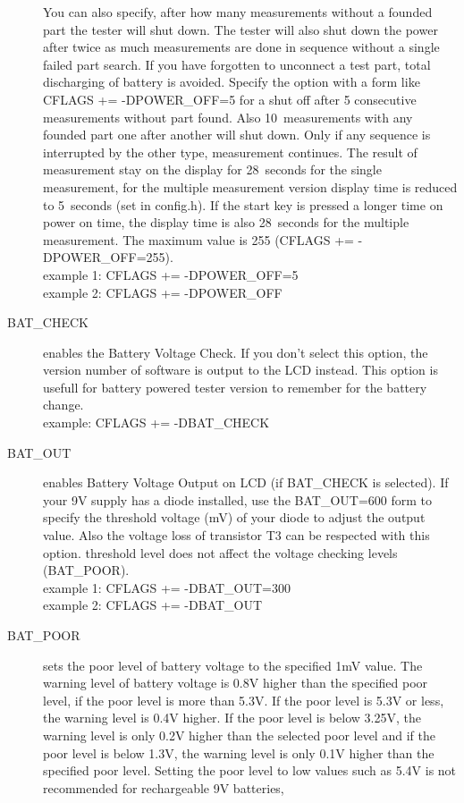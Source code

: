\begin{description}
You can also specify, after how many measurements without a founded part the tester will shut down.
The tester will also shut down the power after twice as much measurements are done in sequence without a
single failed part search. If you have forgotten to unconnect a test part, total discharging of battery is avoided. 
Specify the option with a form like CFLAGS += -DPOWER\_OFF=5 for a shut off after 5 consecutive measurements
without part found. Also 10~measurements with any founded part one after another will shut down.
Only if any sequence is interrupted by the other type, measurement continues.
The result of measurement stay on the display for 28~seconds for the single measurement, for the
multiple measurement version display time is reduced to 5~seconds (set in config.h).
If the start key is pressed a longer time on power on time, the display time is also 28~seconds for the multiple measurement.
The maximum value is 255 (CFLAGS += -DPOWER\_OFF=255).\\
example 1: CFLAGS += -DPOWER\_OFF=5\\
example 2: CFLAGS += -DPOWER\_OFF
  \item[BAT\_CHECK] enables the Battery Voltage Check. If you don't select this option, the version number of
software is output to the LCD instead.
This option is usefull for battery powered tester version to remember for the battery change.\\
example: CFLAGS += -DBAT\_CHECK
  \item[BAT\_OUT] enables Battery Voltage Output on LCD (if BAT\_CHECK is selected).
 If your 9V supply has a diode installed, use the BAT\_OUT=600 form to specify the threshold voltage (mV) of your diode
to adjust the output value.
Also the voltage loss of transistor T3 can be respected with this option.
 threshold level does not affect the voltage checking levels (BAT\_POOR).\\
example 1: CFLAGS += -DBAT\_OUT=300\\
example 2: CFLAGS += -DBAT\_OUT
  \item[BAT\_POOR] sets the poor level of battery voltage to the specified 1mV value.
The warning level of battery voltage is 0.8V higher than the specified poor level, if the poor level is more than 5.3V.
If the poor level is 5.3V or less, the warning level is 0.4V higher. If the poor level is below 3.25V, the
warning level is only 0.2V higher than the selected poor level and if the poor level is below 1.3V, the
warning level is only 0.1V higher than the specified poor level.
Setting the poor level to low values such as 5.4V is not recommended for rechargeable 9V batteries,

\end{description}
